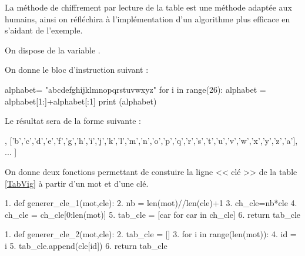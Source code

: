 La méthode de chiffrement par lecture de la table est une méthode adaptée \og aux humains\fg, ainsi on réfléchira à l'implémentation d'un algorithme plus efficace en s'aidant de l'exemple.

On dispose de la variable . 

On donne le bloc d'instruction suivant : 

\begin{pyverbatim}
alphabet= "abcdefghijklmnopqrstuvwxyz"
for i in range(26):
    alphabet = alphabet[1:]+alphabet[:1]
    print (alphabet)
\end{pyverbatim}


Le résultat sera de la forme suivante :
\footnotesize{
\begin{pyverbatim}
[['a','b','c','d','e','f','g','h','i','j','k','l','m','n','o','p','q','r','s','t','u','v','w','x','y','z'], 
 ['b','c','d','e','f','g','h','i','j','k','l','m','n','o','p','q','r','s','t','u','v','w','x','y','z','a'],
 ... ]
\end{pyverbatim}
}

\normalsize

On donne deux fonctions permettant de constuire la ligne << clé >> de la table \ref{TabVig} à partir d'un mot et d'une clé. 
\begin{multicols}{2}
\begin{pyverbatim}
1. def generer_cle_1(mot,cle):
2.     nb = len(mot)//len(cle)+1
3.     ch_cle=nb*cle
4.     ch_cle = ch_cle[0:len(mot)]
5.     tab_cle = [car for car in ch_cle]
6.     return tab_cle
\end{pyverbatim}

\begin{pyverbatim}
1. def generer_cle_2(mot,cle):
2.     tab_cle = []
3.     for i in range(len(mot)):
4.         id = i%
5.         tab_cle.append(cle[id])
6.     return tab_cle
\end{pyverbatim}

\end{multicols}



